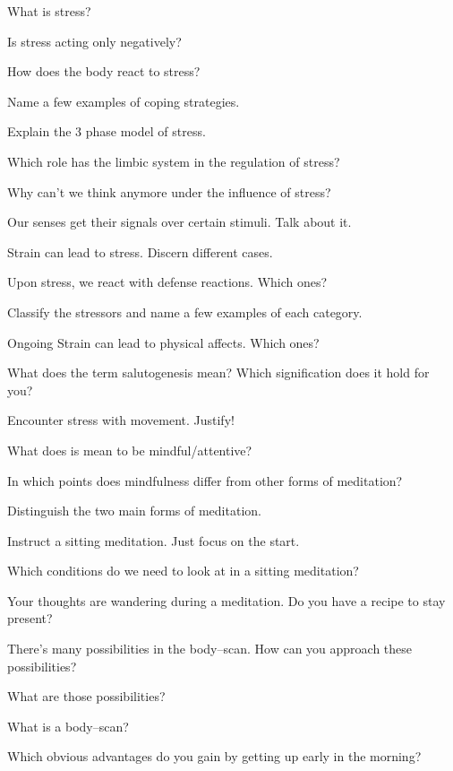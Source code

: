 \documentclass[../main.tex]{subfiles}
\begin{document}
\item What is stress?
\item  Is stress acting only negatively?
\item How does the body react to stress?
\item Name a few examples of coping strategies.
\item Explain the 3 phase model of stress.
\item Which role has the limbic system in the regulation of stress?
  \vspace{0.4cm}
\item Why can't we think anymore under the influence of stress?
\item  Our senses get their signals over certain stimuli. Talk about it.
\item Strain can lead to stress. Discern different cases.
\item Upon stress, we react with defense reactions. Which ones?
  \vspace{0.4cm}
\item Classify the stressors and name a few examples of each category.
\item Ongoing Strain can lead to physical affects. Which ones?
  \vspace{0.4cm}
\item What does the term salutogenesis mean? Which signification does it hold for you?
  \vspace{0.4cm}
\item Encounter stress with movement. Justify!
  \vspace{0.4cm}
\item What does is mean to be mindful/attentive?
\item In which points does mindfulness differ from other forms of meditation?
\item Distinguish the two main forms of meditation.
\item Instruct a sitting meditation. Just focus on the start.
\item Which conditions do we need to look at in a sitting meditation?
\item Your thoughts are wandering during a meditation. Do you have a recipe to stay present?
\item There's many possibilities in the body--scan. How can you approach these possibilities?
  \item What are those possibilities?
  \item What is a body--scan?
  \item Which obvious advantages do you gain by getting up early in the morning?
\end{document}
